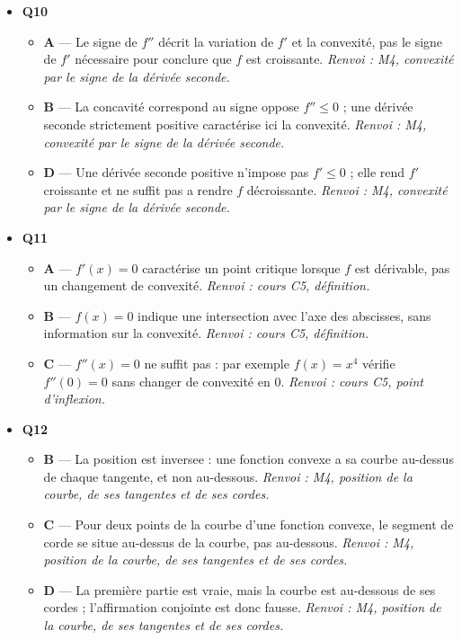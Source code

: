 \begin{itemize}
\begin{itemize}
  \end{itemize}
  \item \textbf{Q10}
  \begin{itemize}
    \item \textbf{A} — Le signe de $f''$ décrit la variation de $f'$ et la convexité, pas le signe de $f'$ nécessaire pour conclure que $f$ est croissante. \emph{Renvoi : M4, convexité par le signe de la dérivée seconde.}
    \item \textbf{B} — La concavité correspond au signe oppose $f''\leq0$ ; une dérivée seconde strictement positive caractérise ici la convexité. \emph{Renvoi : M4, convexité par le signe de la dérivée seconde.}
    \item \textbf{D} — Une dérivée seconde positive n'impose pas $f'\leq0$ ; elle rend $f'$ croissante et ne suffit pas a rendre $f$ décroissante. \emph{Renvoi : M4, convexité par le signe de la dérivée seconde.}
  \end{itemize}
  \item \textbf{Q11}
  \begin{itemize}
    \item \textbf{A} — $f'(x)=0$ caractérise un point critique lorsque $f$ est dérivable, pas un changement de convexité. \emph{Renvoi : cours C5, définition.}
    \item \textbf{B} — $f(x)=0$ indique une intersection avec l'axe des abscisses, sans information sur la convexité. \emph{Renvoi : cours C5, définition.}
    \item \textbf{C} — $f''(x)=0$ ne suffit pas : par exemple $f(x)=x^4$ vérifie $f''(0)=0$ sans changer de convexité en 0. \emph{Renvoi : cours C5, point d'inflexion.}
  \end{itemize}
  \item \textbf{Q12}
  \begin{itemize}
    \item \textbf{B} — La position est inversee : une fonction convexe a sa courbe au-dessus de chaque tangente, et non au-dessous. \emph{Renvoi : M4, position de la courbe, de ses tangentes et de ses cordes.}
    \item \textbf{C} — Pour deux points de la courbe d'une fonction convexe, le segment de corde se situe au-dessus de la courbe, pas au-dessous. \emph{Renvoi : M4, position de la courbe, de ses tangentes et de ses cordes.}
    \item \textbf{D} — La première partie est vraie, mais la courbe est au-dessous de ses cordes ; l'affirmation conjointe est donc fausse. \emph{Renvoi : M4, position de la courbe, de ses tangentes et de ses cordes.}

\end{itemize}
\end{itemize}
